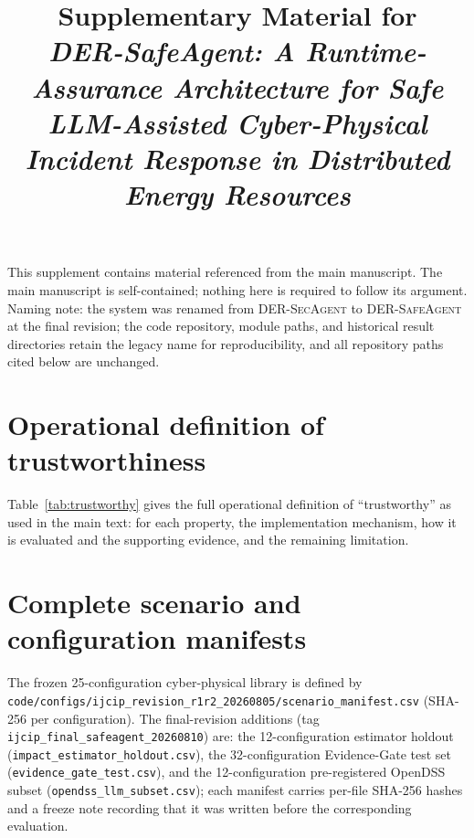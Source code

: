 \documentclass[11pt,a4paper]{article}
\title{Supplementary Material for\\
\emph{DER-SafeAgent: A Runtime-Assurance Architecture for Safe
LLM-Assisted Cyber-Physical Incident Response in Distributed Energy
Resources}}
\date{}
\begin{document}
\maketitle

\noindent This supplement contains material referenced from the main
manuscript. The main manuscript is self-contained; nothing here is
required to follow its argument. Naming note: the system was renamed from
\textsc{DER-SecAgent} to \textsc{DER-SafeAgent} at the final revision;
the code repository, module paths, and historical result directories
retain the legacy name for reproducibility, and all repository paths
cited below are unchanged.

\tableofcontents

\renewcommand{\thesection}{S\arabic{section}}
\renewcommand{\appendix}{}




\section{Operational definition of trustworthiness}
\label{sec:supp-trustworthy}
Table~\ref{tab:trustworthy} gives the full operational definition of
``trustworthy'' as used in the main text: for each property, the implementation
mechanism, how it is evaluated and the supporting evidence, and the remaining
limitation.


\section{Complete scenario and configuration manifests}
The frozen 25-configuration cyber-physical library is defined by
\texttt{code/configs/ijcip\_revision\_r1r2\_20260805/scenario\_manifest.csv}
(SHA-256 per configuration). The final-revision additions
(tag \texttt{ijcip\_final\_safeagent\_20260810}) are:
the 12-configuration estimator holdout
(\texttt{impact\_estimator\_holdout.csv}),
the 32-configuration Evidence-Gate test set
(\texttt{evidence\_gate\_test.csv}),
and the 12-configuration pre-registered OpenDSS subset
(\texttt{opendss\_llm\_subset.csv});
each manifest carries per-file SHA-256 hashes and a freeze note recording
that it was written before the corresponding evaluation.

\end{document}
